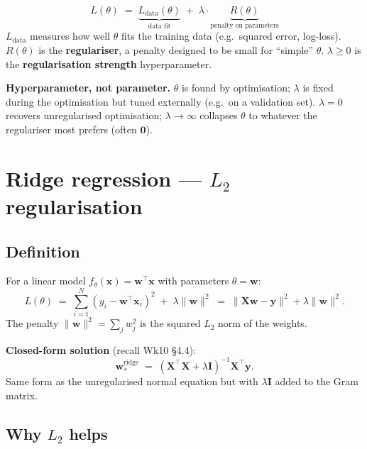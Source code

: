 \documentclass[11pt, a4paper]{article}
\begin{document}
\begin{defbox}
\[
L(\theta) \;=\; \underbrace{L_{\text{data}}(\theta)}_{\text{data fit}} \;+\; \lambda\cdot \underbrace{R(\theta)}_{\text{penalty on parameters}}
\]
$L_{\text{data}}$ measures how well $\theta$ fits the training data (e.g.\ squared error, log-loss). $R(\theta)$ is the \textbf{regulariser}, a penalty designed to be small for ``simple'' $\theta$. $\lambda \ge 0$ is the \textbf{regularisation strength} hyperparameter.
\end{defbox}

\textbf{Hyperparameter, not parameter.} $\theta$ is found by optimisation; $\lambda$ is fixed during the optimisation but tuned externally (e.g.\ on a validation set). $\lambda = 0$ recovers unregularised optimisation; $\lambda \to \infty$ collapses $\theta$ to whatever the regulariser most prefers (often $\mathbf{0}$).

\section{Ridge regression --- $L_2$ regularisation}

\subsection{Definition}

\begin{defbox}
For a linear model $f_\theta(\mathbf{x}) = \mathbf{w}^\top\mathbf{x}$ with parameters $\theta = \mathbf{w}$:
\[
L(\theta) \;=\; \sum_{i=1}^N (y_i - \mathbf{w}^\top\mathbf{x}_i)^2 \;+\; \lambda\|\mathbf{w}\|^2 \;=\; \|\mathbf{X}\mathbf{w} - \mathbf{y}\|^2 + \lambda\|\mathbf{w}\|^2.
\]
The penalty $\|\mathbf{w}\|^2 = \sum_j w_j^2$ is the squared $L_2$ norm of the weights.
\end{defbox}

\textbf{Closed-form solution} (recall Wk10 §4.4):
\[
\mathbf{w}_*^{\text{ridge}} \;=\; (\mathbf{X}^\top\mathbf{X} + \lambda\mathbf{I})^{-1}\mathbf{X}^\top\mathbf{y}.
\]
Same form as the unregularised normal equation but with $\lambda\mathbf{I}$ added to the Gram matrix.

\subsection{Why $L_2$ helps}
\end{document}

